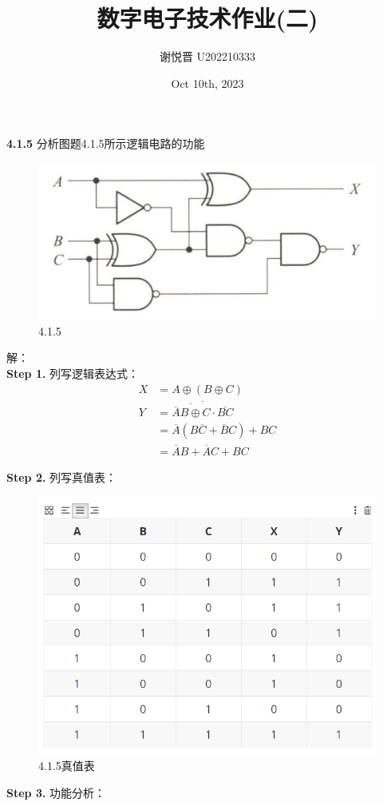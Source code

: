 \documentclass[a4paper,11pt,UTF8]{article}
\title{数字电子技术作业(二)}
\author{谢悦晋 \quad U202210333}
\date{Oct 10th, 2023 }
\begin{document}
\maketitle
\textbf{4.1.5} 分析图题4.1.5所示逻辑电路的功能\\
\begin{figure}[H]
	\centering
	\includegraphics[scale=0.2]{SD4.1.5}
	\caption{4.1.5}
\end{figure}
解：\\

\textbf{Step 1.} 列写逻辑表达式：
$$\begin{aligned}
	X&=A\oplus(B\oplus C)\\
	Y&=\overline{\overline{\overline{A}B\oplus C}\cdot\overline{BC}}\\
	&=\overline{A}(B\overline{C}+\overline{B}C)+BC\\
	&=\overline{A}B+\overline{A}C+BC
\end{aligned}
$$

\textbf{Step 2.} 列写真值表：
\begin{figure}[H]
	\centering
	\includegraphics[scale=0.5]{SD4.1.5_1}
	\caption{4.1.5真值表}
\end{figure}
\textbf{Step 3.} 功能分析：
\end{document}
